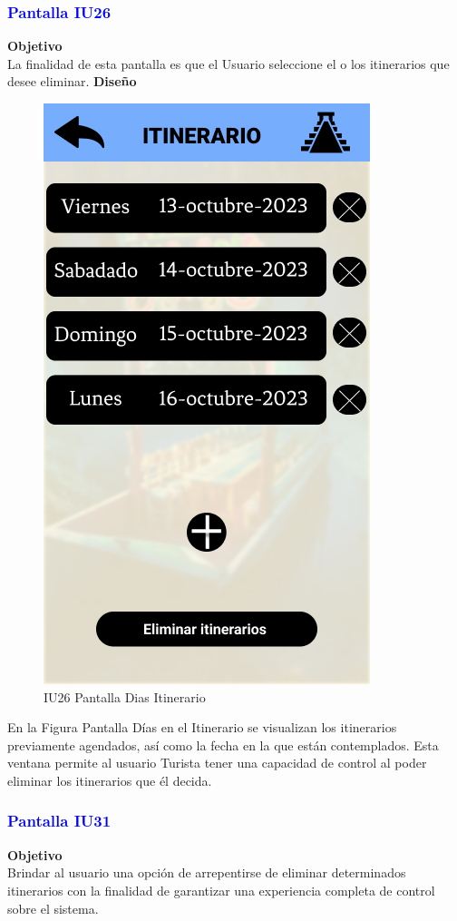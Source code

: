 \newpage
\subsubsection{\textcolor{blue}{Pantalla IU26}}
\textbf{Objetivo} \\
La finalidad de esta pantalla es que el Usuario seleccione el o los itinerarios que desee eliminar.
\vspace{15pt}
\textbf{Diseño}
\begin{figure}[htb]
    \centering 
        \includegraphics[width=.5\linewidth]{Pantallas Prototipo3/IU26 Pantalla Dias Itinerario.jpg}
        \caption{IU26 Pantalla Dias Itinerario}
\end{figure}


  
En la Figura Pantalla Días en el Itinerario se visualizan los itinerarios previamente agendados, así como la fecha en la que están contemplados. Esta ventana permite al usuario Turista tener una capacidad de control al poder eliminar los itinerarios que él decida.
\newpage

\subsubsection{\textcolor{blue}{Pantalla IU31}}

\textbf{Objetivo} \\
Brindar al usuario una opción de arrepentirse de eliminar determinados itinerarios con la finalidad de garantizar una experiencia completa de control sobre el sistema.
\vspace{15pt}

